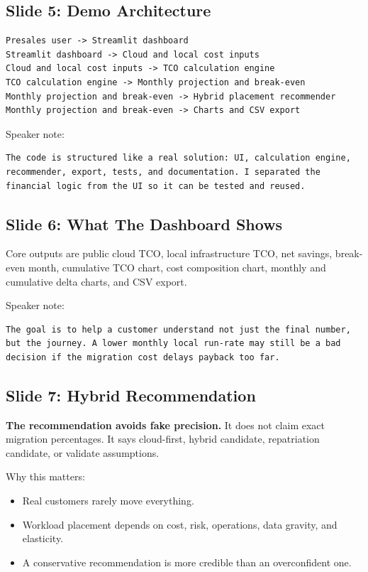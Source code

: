 \documentclass[11pt,a4paper]{article}
\begin{document}
\subsection{Slide 5: Demo Architecture}

\begin{lstlisting}
Presales user -> Streamlit dashboard
Streamlit dashboard -> Cloud and local cost inputs
Cloud and local cost inputs -> TCO calculation engine
TCO calculation engine -> Monthly projection and break-even
Monthly projection and break-even -> Hybrid placement recommender
Monthly projection and break-even -> Charts and CSV export
\end{lstlisting}

Speaker note:

\begin{lstlisting}
The code is structured like a real solution: UI, calculation engine, recommender, export, tests, and documentation. I separated the financial logic from the UI so it can be tested and reused.
\end{lstlisting}

\subsection{Slide 6: What The Dashboard Shows}

Core outputs are public cloud TCO, local infrastructure TCO, net savings, break-even month, cumulative TCO chart, cost composition chart, monthly and cumulative delta charts, and CSV export.

Speaker note:

\begin{lstlisting}
The goal is to help a customer understand not just the final number, but the journey. A lower monthly local run-rate may still be a bad decision if the migration cost delays payback too far.
\end{lstlisting}

\subsection{Slide 7: Hybrid Recommendation}

\textbf{The recommendation avoids fake precision.} It does not claim exact migration percentages. It says cloud-first, hybrid candidate, repatriation candidate, or validate assumptions.

Why this matters:

\begin{itemize}
  \item Real customers rarely move everything.
  \item Workload placement depends on cost, risk, operations, data gravity, and elasticity.
  \item A conservative recommendation is more credible than an overconfident one.
\end{itemize}
\end{document}
